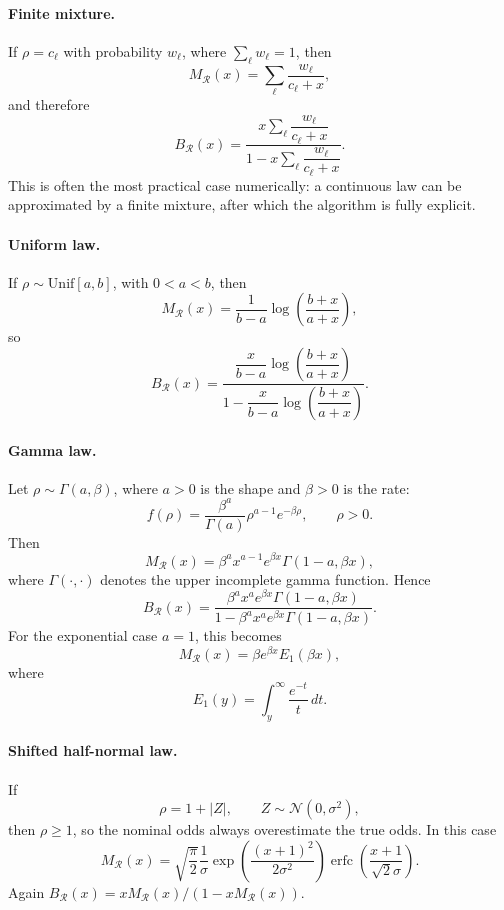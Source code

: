 \documentclass[11pt,a4paper]{article}
\begin{document}
\paragraph{Finite mixture.}
If $\rho=c_\ell$ with probability $w_\ell$, where $\sum_\ell w_\ell=1$, then
\[
  M_{\mathcal R}(x)=\sum_\ell\frac{w_\ell}{c_\ell+x},
\]
and therefore
\[
  B_{\mathcal R}(x)
  =
  \frac{
    x\sum_\ell\dfrac{w_\ell}{c_\ell+x}
  }{
    1-x\sum_\ell\dfrac{w_\ell}{c_\ell+x}
  }.
\]
This is often the most practical case numerically: a continuous law can be
approximated by a finite mixture, after which the algorithm is fully explicit.

\paragraph{Uniform law.}
If $\rho\sim\mathrm{Unif}[a,b]$, with $0<a<b$, then
\[
  M_{\mathcal R}(x)
  =\frac1{b-a}\log\left(\frac{b+x}{a+x}\right),
\]
so
\[
  B_{\mathcal R}(x)
  =
  \frac{
    \dfrac{x}{b-a}\log\left(\dfrac{b+x}{a+x}\right)
  }{
    1-\dfrac{x}{b-a}\log\left(\dfrac{b+x}{a+x}\right)
  }.
\]

\paragraph{Gamma law.}
Let $\rho\sim\Gamma(a,\beta)$, where $a>0$ is the shape and $\beta>0$ is the rate:
\[
  f(\rho)=\frac{\beta^a}{\Gamma(a)}\rho^{a-1}e^{-\beta\rho},
  \qquad \rho>0.
\]
Then
\[
  \boxed{
  M_{\mathcal R}(x)
  =
  \beta^a x^{a-1}e^{\beta x}\Gamma(1-a,\beta x),
  }
  \tag{16}
\]
where $\Gamma(\cdot,\cdot)$ denotes the upper incomplete gamma function.  Hence
\[
  \boxed{
  B_{\mathcal R}(x)
  =
  \frac{
    \beta^a x^a e^{\beta x}\Gamma(1-a,\beta x)
  }{
    1-\beta^a x^a e^{\beta x}\Gamma(1-a,\beta x)
  }.
  }
  \tag{17}
\]
For the exponential case $a=1$, this becomes
\[
  M_{\mathcal R}(x)=\beta e^{\beta x}E_1(\beta x),
\]
where
\[
  E_1(y)=\int_y^\infty\frac{e^{-t}}{t}\,dt.
\]

\paragraph{Shifted half-normal law.}
If
\[
  \rho=1+|Z|,
  \qquad
  Z\sim\mathcal N(0,\sigma^2),
\]
then $\rho\ge1$, so the nominal odds always overestimate the true odds.  In this
case
\[
  \boxed{
  M_{\mathcal R}(x)
  =
  \sqrt{\frac\pi2}\frac1\sigma
  \exp\left(\frac{(x+1)^2}{2\sigma^2}\right)
  \operatorname{erfc}\left(\frac{x+1}{\sqrt2\sigma}\right).
  }
  \tag{18}
\]
Again $B_{\mathcal R}(x)=xM_{\mathcal R}(x)/(1-xM_{\mathcal R}(x))$.
\end{document}
